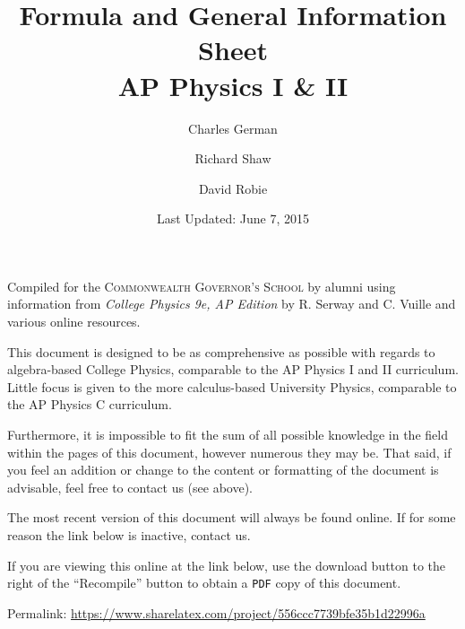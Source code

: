 \documentclass[11pt,letterpaper]{article}%
\title{Formula and General Information Sheet \\ \large{AP Physics I \& II}}
\author{Charles German}\affil{Bridgewater College, \email{cgerman@eagles.bridgewater.edu}}
\author{Richard Shaw}\affil{University of Virginia, \email{rcs8vq@virginia.edu}}
\author{David Robie}\affil{Virginia Commonwealth University, \email{robiedr@mymail.vcu.edu}} %
\date{Last Updated: June 7, 2015}%
\newcommand{\lcp}{%
  Permalink: \url{https://www.sharelatex.com/project/556ccc7739bfe35b1d22996a}
}
\begin{document}
\maketitle
\thispagestyle{empty}
\begin{center}
	Compiled for the \textsc{Commonwealth Governor's School} by alumni using information from \textit{College Physics 9e, AP Edition} by R. Serway and C. Vuille and various online resources.
\end{center}

\par This document is designed to be as comprehensive as possible with regards to algebra-based College Physics, comparable to the AP Physics I and II curriculum. Little focus is given to the more calculus-based University Physics, comparable to the AP Physics C curriculum. \\

\par Furthermore, it is impossible to fit the sum of all possible knowledge in the field within the pages of this document, however numerous they may be. That said, if you feel an addition or change to the content or formatting of the document is advisable, feel free to contact us (see above). \\

\par The most recent version of this document will always be found online. If for some reason the link below is inactive, contact us. \\

\par If you are viewing this online at the link below, use the download button to the right of the ``Recompile'' button to obtain a \texttt{PDF} copy of this document. \\

\par\lcp 

\clearpage
\tableofcontents

\setlength\parskip{1em}%
\end{document}
